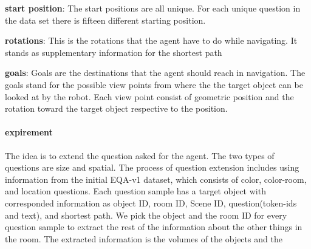 \textbf{start position}: The start positions are all unique. For each unique question in the data set there is fifteen different starting position. 

\textbf{rotations}: This is the rotations that the agent have to do while navigating. It stands as supplementary information for the shortest path 

\textbf{goals}: Goals are the destinations that the agent should reach in navigation. The goals stand for the possible view points from where the the target object can be looked at by the robot. Each view point consist of geometric position and the rotation toward the target object respective to the position. 




\paragraph{expirement}


The idea is to extend the question asked for the agent. The two types of questions are size and spatial. The process of question extension includes using information from the initial EQA-v1  dataset, which consists of color, color-room, and location questions. Each question sample has a target object with corresponded information as object ID, room ID, Scene ID, question(token-ids and text), and shortest path. We pick the object and the room ID for every question sample to extract the rest of the information about the other things in the room. The extracted information is the volumes of the objects and the 


